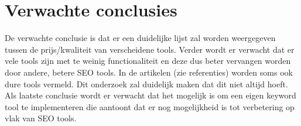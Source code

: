 \section{Verwachte conclusies}
\label{sec:verwachte_conclusies}

De verwachte conclusie is dat er een duidelijke lijst zal worden weergegeven tussen de prijs/kwaliteit van verscheidene tools. Verder wordt er verwacht dat er vele tools zijn met te weinig functionaliteit en deze dus beter vervangen worden door andere, betere SEO tools. In de artikelen (zie referenties) worden soms ook dure tools vermeld. Dit onderzoek zal duidelijk maken dat dit niet altijd hoeft. Als laatste conclusie wordt er verwacht dat het mogelijk is om een eigen keyword tool te implementeren die aantoont dat er nog mogelijkheid is tot verbetering op vlak van SEO tools.


